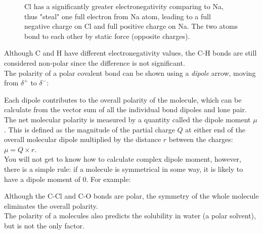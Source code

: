 \documentclass{report}
\begin{document}
		 \begin{figure}[H]
		 \centering
		 \captionsetup{justification=centering, margin=2cm}
			\caption{Cl has a significantly greater electronegativity comparing to Na, thus "steal" one full electron from Na atom, leading to a full negative charge on Cl and full positive charge on Na. The two atoms bond to each other by static force (opposite charges).}
		 \end{figure}
		 
		 Although C and H have different electronegativity values, the C-H bonds are still considered non-polar since the difference is not significant. \\
		 
		 The polarity of a polar covalent bond can be shown using a \textit{dipole} arrow, moving from $\delta^+$ to $\delta^-$: 
		\begin{center}
          	\end{center}
	
		Each dipole contributes to the overall polarity of the molecule, which can be calculate from the vector sum of all the individual bond dipoles and lone pair. The net molecular polarity is measured by a quantity called the dipole moment $\mu$. This is defined as the magnitude of the partial charge $Q$ at either end of the overall molecular dipole multiplied by the distance $r$ between the charges: $\mu = Q \times r$. \\
		
		You will not get to know how to calculate complex dipole moment, however, there is a simple rule: if a molecule is symmetrical in some way, it is likely to have a dipole moment of 0. For example:
		\begin{center}
			\qquad
		\end{center}
		Although the C-Cl and C-O bonds are polar, the symmetry of the whole molecule eliminates the overall polarity. \\
		
		The polarity of a molecules also predicts the solubility in water (a polar solvent), but is not the only factor.\\
		
\end{document}

